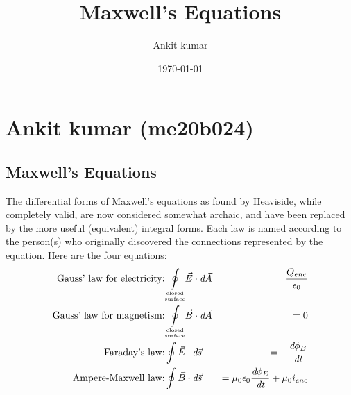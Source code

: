 \documentclass[a5paper, 12pt]{article}
\begin{document}
\title{Maxwell's Equations}
\author{Ankit kumar}
\date{\today}
\maketitle

\section{Ankit kumar (me20b024)}


\def\eps0{\ensuremath{\epsilon _0}}
\def\muz{\ensuremath{\mu_0}}

\def\cint#1{\ensuremath{\displaystyle\underset{\substack{\text{\tiny{closed}}\\\text{\tiny{surface}}}}{\oint} \mspace{-0.1 mu} #1}}

\def\phie{\ensuremath{\phi_E}}
\def\phib{\ensuremath{\phi_B}}

\def\dA{\ensuremath{\emph{d}\vec{A}}}
\def\dB{\ensuremath{\emph{d}\vec{B}}}
\def\ds{\ensuremath{\emph{d}\vec{s}}}
\def\dt{\ensuremath{\emph{dt}}}
\def\dphie{\ensuremath{\emph{d}\phie}}
\def\dphib{\ensuremath{\emph{d}\phib}}






\subsection{Maxwell's Equations}

\indent The differential forms of Maxwell's equations as found by Heaviside, while completely valid, are now considered somewhat archaic, and have been replaced by the more useful (equivalent) integral forms. Each law is named according to the person(s) who originally discovered the connections represented by the equation. Here are the four equations:
\begin{eqnarray}
\label{eq:gauss_ele}
\text{Gauss' law for electricity:}& \displaystyle \cint{\vec{E}\cdot\dA}&=\frac{Q_{enc}}{\eps0}\\
\label{eq:gauss_mag}
\text{Gauss' law for magnetism:}& \displaystyle \cint{\vec{B}\cdot\dA}&=0\\
\label{eq:faraday}
\text{Faraday's law:}& \displaystyle\oint{\vec{E}\cdot\ds}&=-\frac{\dphib}{\dt}\\
\label{eq:ampere}
\text{Ampere-Maxwell law:}& \displaystyle\oint{\vec{B}\cdot\ds}&=\muz\eps0\frac{\dphie}{\dt}+\muz i_{enc}
\end{eqnarray}
\end{document}
